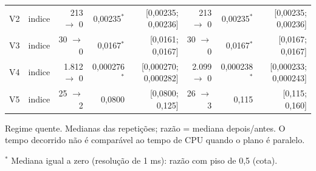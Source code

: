 {\begin{tabular}{llrrrrrr}
V2 & indice & 213 $\to$ 0 & 0,00235$^{*}$ & [0,00235; 0,00236] & 213 $\to$ 0 & 0,00235$^{*}$ & [0,00235; 0,00236] \\
V3 & indice & 30 $\to$ 0 & 0,0167$^{*}$ & [0,0161; 0,0167] & 30 $\to$ 0 & 0,0167$^{*}$ & [0,0167; 0,0167] \\
V4 & indice & 1.812 $\to$ 0 & 0,000276$^{*}$ & [0,000270; 0,000282] & 2.099 $\to$ 0 & 0,000238$^{*}$ & [0,000233; 0,000243] \\
V5 & indice & 25 $\to$ 2 & 0,0800 & [0,0800; 0,125] & 26 $\to$ 3 & 0,115 & [0,115; 0,160] \\
\bottomrule
\end{tabular}\par
\vspace{3pt}
\begin{minipage}{\linewidth}\footnotesize
Regime quente. Medianas das repetições; razão = mediana depois/antes. O tempo decorrido não é comparável ao tempo de CPU quando o plano é paralelo.\par
$^{*}$ Mediana igual a zero (resolução de 1 ms): razão com piso de 0,5 (cota).
\end{minipage}
}
